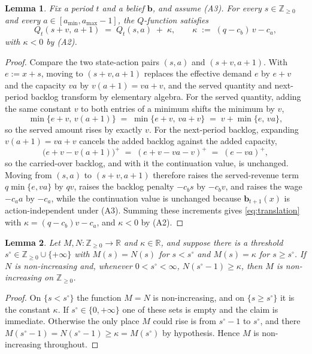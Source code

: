\documentclass[preprint,11pt,authoryear]{elsarticle}
\newcommand{\bvec}[1]{\mathbf{#1}}
\newtheorem{lemma}{Lemma}
\theoremstyle{remark}
\begin{document}
\begin{lemma}
\label{lem:translation}
Fix a period $t$ and a belief $\bvec{b}$, and assume (A3). For every $s \in \mathbb{Z}_{\ge 0}$ and every $a \in [a_{\min}, a_{\max}-1]$, the $Q$-function satisfies
\begin{equation}
Q_t(s+v,\,a+1) \;=\; Q_t(s,a) \;+\; \kappa, \qquad \kappa \;:=\; (q-c_b)\,v - c_a,
\label{eq:translation}
\end{equation}
with $\kappa < 0$ by (A2).
\end{lemma}

\begin{proof}
Compare the two state-action pairs $(s,a)$ and $(s+v,a+1)$. With $e := x+s$, moving to $(s+v,a+1)$ replaces the effective demand $e$ by $e+v$ and the capacity $va$ by $v(a+1)=va+v$, and the served quantity and next-period backlog transform by elementary algebra. For the served quantity, adding the same constant $v$ to both entries of a minimum shifts the minimum by $v$,
\[
\min\{e+v,\,v(a+1)\} \;=\; \min\{e+v,\,va+v\} \;=\; v + \min\{e,\,va\},
\]
so the served amount rises by exactly $v$. For the next-period backlog, expanding $v(a+1)=va+v$ cancels the added backlog against the added capacity,
\[
\bigl(e+v - v(a+1)\bigr)^+ \;=\; (e+v-va-v)^+ \;=\; (e - va)^+,
\]
so the carried-over backlog, and with it the continuation value, is unchanged. Moving from $(s,a)$ to $(s+v,a+1)$ therefore raises the served-revenue term $q\min\{e,va\}$ by $qv$, raises the backlog penalty $-c_b s$ by $-c_b v$, and raises the wage $-c_a a$ by $-c_a$, while the continuation value is unchanged because $\bvec{b}_{t+1}(x)$ is action-independent under (A3). Summing these increments gives \eqref{eq:translation} with $\kappa = (q-c_b)v - c_a$, and $\kappa < 0$ by (A2).
\end{proof}

\begin{lemma}
\label{lem:threshold}
Let $M, N : \mathbb{Z}_{\ge 0} \to \mathbb{R}$ and $\kappa \in \mathbb{R}$, and suppose there is a threshold $s^\circ \in \mathbb{Z}_{\ge 0} \cup \{+\infty\}$ with $M(s) = N(s)$ for $s < s^\circ$ and $M(s) = \kappa$ for $s \ge s^\circ$. If $N$ is non-increasing and, whenever $0 < s^\circ < \infty$, $N(s^\circ - 1) \ge \kappa$, then $M$ is non-increasing on $\mathbb{Z}_{\ge 0}$.
\end{lemma}

\begin{proof}
On $\{s < s^\circ\}$ the function $M = N$ is non-increasing, and on $\{s \ge s^\circ\}$ it is the constant $\kappa$. If $s^\circ \in \{0, +\infty\}$ one of these sets is empty and the claim is immediate. Otherwise the only place $M$ could rise is from $s^\circ - 1$ to $s^\circ$, and there $M(s^\circ - 1) = N(s^\circ - 1) \ge \kappa = M(s^\circ)$ by hypothesis. Hence $M$ is non-increasing throughout.
\end{proof}
\end{document}
